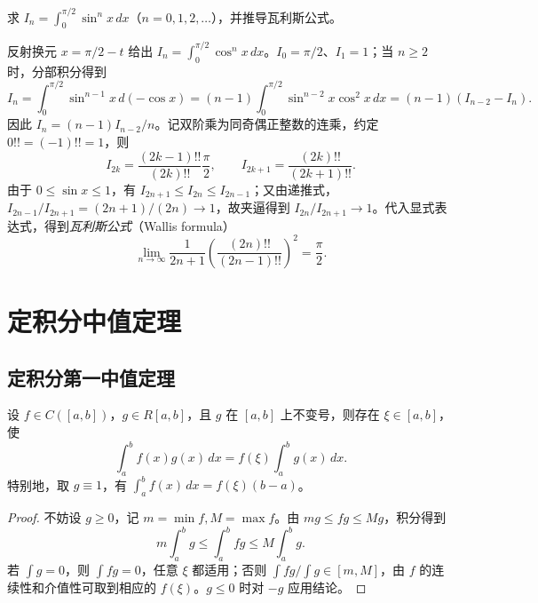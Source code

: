 \begin{example}
\label{ex:wallis-recurrence-and-product}
求 $I_n=\int_0^{\pi/2}\sin^nx\,dx$（$n=0,1,2,\ldots$），并推导瓦利斯公式。
\end{example}
\begin{solve}
反射换元 $x=\pi/2-t$ 给出 $I_n=\int_0^{\pi/2}\cos^nx\,dx$。$I_0=\pi/2$、$I_1=1$；当 $n\geq2$ 时，分部积分得到
\[
    I_n=\int_0^{\pi/2}\sin^{n-1}x\,d(-\cos x)
    =(n-1)\int_0^{\pi/2}\sin^{n-2}x\cos^2x\,dx
    =(n-1)(I_{n-2}-I_n).
\]
因此 $I_n=(n-1)I_{n-2}/n$。记双阶乘为同奇偶正整数的连乘，约定 $0!!=(-1)!!=1$，则
\[
    I_{2k}=\frac{(2k-1)!!}{(2k)!!}\frac{\pi}{2},\qquad
    I_{2k+1}=\frac{(2k)!!}{(2k+1)!!}.
\]
由于 $0\leq\sin x\leq1$，有 $I_{2n+1}\leq I_{2n}\leq I_{2n-1}$；又由递推式，$I_{2n-1}/I_{2n+1}=(2n+1)/(2n)\to1$，故夹逼得到 $I_{2n}/I_{2n+1}\to1$。代入显式表达式，得到\emph{瓦利斯公式}（Wallis formula）
\begin{equation}
    \lim_{n\to\infty}
    \frac1{2n+1}\left(\frac{(2n)!!}{(2n-1)!!}\right)^2
    =\frac{\pi}{2}.
    \label{eq:wallis-product-limit}
\end{equation}
\end{solve}

\section{定积分中值定理}
\label{sec:integral-mean-value-theorems}

\subsection{定积分第一中值定理}
\label{subsec:first-integral-mean-value-theorem}

\begin{theorem}[定积分第一中值定理]
\label{thm:first-integral-mean-value}
设 $f\in C([a,b])$，$g\in R[a,b]$，且 $g$ 在 $[a,b]$ 上不变号，则存在 $\xi\in[a,b]$，使
\begin{equation}
    \int_a^b f(x)g(x)\,dx=f(\xi)\int_a^b g(x)\,dx.
    \label{eq:first-integral-mean-value}
\end{equation}
特别地，取 $g\equiv1$，有 $\int_a^b f(x)\,dx=f(\xi)(b-a)$。
\end{theorem}
\begin{proof}
不妨设 $g\geq0$，记 $m=\min f,M=\max f$。由 $mg\leq fg\leq Mg$，积分得到
\[
    m\int_a^b g\leq\int_a^b fg\leq M\int_a^b g.
\]
若 $\int g=0$，则 $\int fg=0$，任意 $\xi$ 都适用；否则 $\int fg/\int g\in[m,M]$，由 $f$ 的连续性和介值性可取到相应的 $f(\xi)$。$g\leq0$ 时对 $-g$ 应用结论。
\end{proof}

